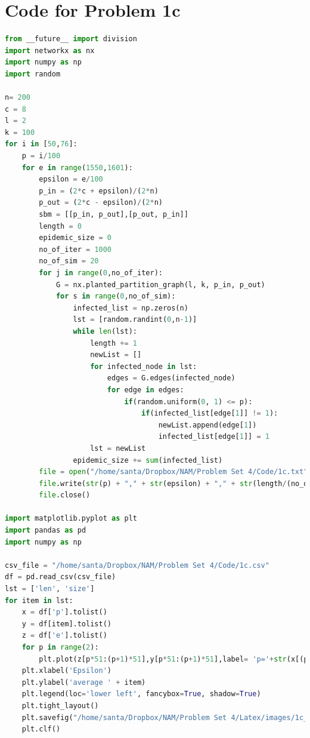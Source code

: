 \documentclass{article}
\begin{document}
\section*{Code for Problem 1c}
\begin{lstlisting}[language=Python, breaklines=true]
from __future__ import division
import networkx as nx
import numpy as np
import random

n= 200
c = 8
l = 2
k = 100
for i in [50,76]:
    p = i/100
    for e in range(1550,1601):
        epsilon = e/100
        p_in = (2*c + epsilon)/(2*n)
        p_out = (2*c - epsilon)/(2*n)
        sbm = [[p_in, p_out],[p_out, p_in]]
        length = 0
        epidemic_size = 0
        no_of_iter = 1000
        no_of_sim = 20
        for j in range(0,no_of_iter):
            G = nx.planted_partition_graph(l, k, p_in, p_out)
            for s in range(0,no_of_sim):
                infected_list = np.zeros(n)
                lst = [random.randint(0,n-1)]
                while len(lst):
                    length += 1
                    newList = []
                    for infected_node in lst:
                        edges = G.edges(infected_node)
                        for edge in edges:
                            if(random.uniform(0, 1) <= p):
                                if(infected_list[edge[1]] != 1):
                                    newList.append(edge[1])
                                    infected_list[edge[1]] = 1
                    lst = newList
                epidemic_size += sum(infected_list)
        file = open("/home/santa/Dropbox/NAM/Problem Set 4/Code/1c.txt", "a")
        file.write(str(p) + "," + str(epsilon) + "," + str(length/(no_of_iter*no_of_sim)) + "," + str(epidemic_size/(no_of_iter*no_of_sim)) + "\n")
        file.close()

import matplotlib.pyplot as plt
import pandas as pd
import numpy as np

csv_file = "/home/santa/Dropbox/NAM/Problem Set 4/Code/1c.csv"
df = pd.read_csv(csv_file)
lst = ['len', 'size']
for item in lst:
    x = df['p'].tolist()
    y = df[item].tolist()
    z = df['e'].tolist()
    for p in range(2):
    	plt.plot(z[p*51:(p+1)*51],y[p*51:(p+1)*51],label= 'p='+str(x[(p*51)+1]))
    plt.xlabel('Epsilon')
    plt.ylabel('average ' + item)
    plt.legend(loc='lower left', fancybox=True, shadow=True)
    plt.tight_layout()
    plt.savefig("/home/santa/Dropbox/NAM/Problem Set 4/Latex/images/1c_"+ item + ".png")
    plt.clf()
\end{lstlisting}
\end{document}
